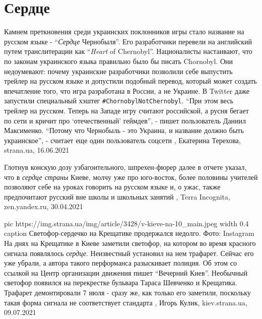  
 
 
 
 
\chapter{Сердце}
\label{sec:slova.serdce}

Камнем преткновения среди украинских поклонников игры стало название на русском
языке - \enquote{\emph{Сердце} Чернобыля}. Его разработчики перевели на
английский путем транслитерации как \enquote{\emph{Heart} of Chernobyl}.
Националисты настаивают, что по законам украинского языка правильно было бы
писать Chornobyl. Они недоумевают: почему украинские разработчики позволили
себе выпустить трейлер на русском языке и допустили подобный перевод, который
может создать впечатление того, что игра разработана в России, а не Украине.  В
Twitter даже запустили специальный хэштег \verb|#ChornobylNotChernobyl|.
\enquote{При этом весь трейлер на русском. Теперь на Западе игру считают
российской, а русня бегает по сети и кричит про \enquote{отечественный}
геймдев}, - пишет пользователь Даниил Максименко.  \enquote{Потому что
Чернобыль - это Украина, и название должно быть украинское}, - считает еще один
пользователь соцсети
, 
Екатерина Терехова, strana.ua, 16.06.2021

Глотнув конскую дозу узбагоительного, шпрехен-фюрер далее в отчете указал, что
в \emph{сердце страны} Киеве, молчу уже про юго-восток, более половины учителей
позволяют себе на уроках говорить на русском языке и, о ужас, также
предпочитают русский вне школы и школьных занятий
, 
Terra Incognita, zen.yandex.ru, 30.04.2021

\ifcmt
  pic https://img.strana.ua/img/article/3428/v-kieve-na-10_main.jpeg
	width 0.4
	caption Светофор-сердечко на Крещатике продержался недолго. Фото: Instagram
\fi
На днях на Крещатике в Киеве заметили светофор, на котором во время красного
сигнала появлялось \emph{сердце}. Неизвестный установил на нем трафарет. Сейчас
его уже убрали, а автора такого перформанса разыскивает полиция.  Об этом со
ссылкой на Центр организации движения пишет \enquote{Вечерний Киев}.  Необычный
светофор появился на перекрестке бульвара Тараса Шевченко и Крещатика. Трафарет
демонтировали 7 июля - сразу же, как только его заметили, поскольку такая форма
сигнала не соответствует стандарта
, 
Игорь Кулик, kiev.strana.ua, 09.07.2021

